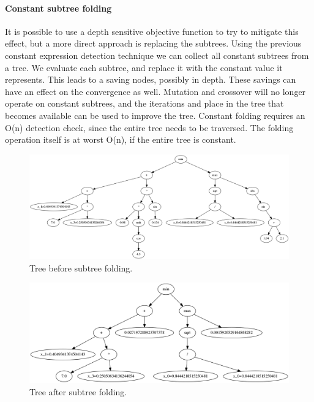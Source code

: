 \paragraph{Constant subtree folding}
It is possible to use a depth sensitive objective function to try to mitigate this effect, but a more direct approach is replacing the subtrees.
Using the previous constant expression detection technique we can collect all constant subtrees from a tree. We evaluate each subtree, and replace it with the constant value it represents. This leads to a saving nodes, possibly in depth. These savings can have an effect on the convergence as well. Mutation and crossover will no longer operate on constant subtrees, and the iterations and place in the tree that becomes available can be used to improve the tree.
Constant folding requires an O(n) detection check, since the entire tree needs to be traversed. The folding operation itself is at worst O(n), if the entire tree is constant.
\begin{figure}
    \centering
    \includegraphics[width=\textwidth,height=\textheight,keepaspectratio]{figures/prefold.png}
    \caption{Tree before subtree folding.}
    \label{fig:prefold}
\end{figure}
\begin{figure}
    \centering
    \includegraphics[width=\textwidth,height=\textheight,keepaspectratio]{figures/postfold.png}
    \caption{Tree after subtree folding.}
    \label{fig:postfold}
\end{figure}


